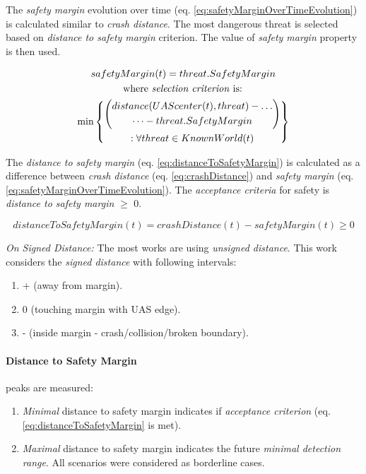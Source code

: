 The \emph{safety margin} evolution over time (eq. \ref{eq:safetyMarginOverTimeEvolution}) is calculated similar to \emph{crash distance}. The most dangerous threat is selected based on \emph{distance to safety margin} criterion. The value of \emph{safety margin} property is then used.

\begin{multline}\label{eq:safetyMarginOverTimeEvolution}
    safety Margin(t) =  threat.SafetyMargin\\\text{  where \emph{selection criterion} is:  }\\ \min \left\{\begin{gathered}\left( \begin{gathered} distance(UAScenter(t),threat)-\dots\\\dots-threat.SafetyMargin\end{gathered}\right)\\:\forall threat \in KnownWorld (t)\end{gathered}\right\}
\end{multline}

\noindent The \emph{distance to safety margin} (eq. \ref{eq:distanceToSafetyMargin}) is calculated as a difference between \emph{crash distance} (eq. \ref{eq:crashDistance}) and \emph{safety margin} (eq. \ref{eq:safetyMarginOverTimeEvolution}). The \emph{acceptance criteria} for safety is \emph{distance to safety margin} $\ge$ 0.

\begin{equation}\label{eq:distanceToSafetyMargin}
    distanceToSafetyMargin(t) =  crashDistance(t) - safetyMargin(t) \ge 0
\end{equation}

\begin{note}
\emph{On Signed Distance:} The most works are using \emph{unsigned distance}. This work considers the \emph{signed distance} with following intervals:
\begin{enumerate}
	\item + (away from margin).
	\item 0 (touching margin with UAS edge).
	\item - (inside margin - crash/collision/broken boundary).
\end{enumerate}
\end{note}

\paragraph{Distance to Safety Margin} peaks are measured:
\begin{enumerate}
    \item \emph{Minimal} distance to safety margin indicates if \emph{acceptance criterion} (eq. \ref{eq:distanceToSafetyMargin} is met).
    \item \emph{Maximal} distance to safety margin indicates the future \emph{minimal detection range}. All scenarios were considered as borderline cases.
\end{enumerate}

